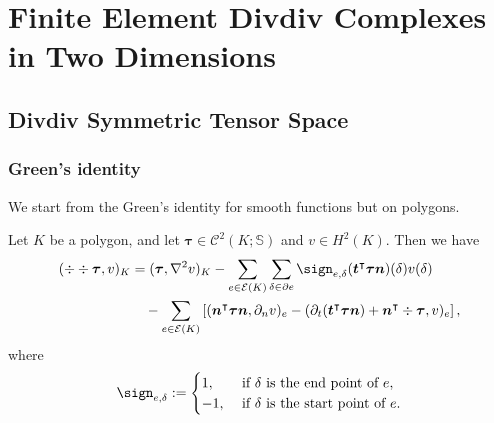\chapter{Finite Element Divdiv Complexes in Two Dimensions}



\section{Divdiv Symmetric Tensor Space}
\subsection{Green's identity}
We start from the Green's identity for smooth functions but on polygons.
\begin{lemma} \label{lm:Green}
Let $K$ be a polygon, and let $\boldsymbol  \tau\in \mathcal C^2(K; \mathbb S)$ and $v\in H^2(K)$. Then we have
\begin{align}
(\div\div\boldsymbol \tau, v)_K&=(\boldsymbol \tau, \nabla^2v)_K -\sum_{e\in\mathcal E(K)}\sum_{\delta\in\partial e}\sign_{e,\delta}(\boldsymbol  t^{\intercal}\boldsymbol \tau\boldsymbol  n)(\delta)v(\delta) \notag\\
&\quad - \sum_{e\in\mathcal E(K)}\left[(\boldsymbol  n^{\intercal}\boldsymbol \tau\boldsymbol n, \partial_n v)_{e}-(\partial_{t}(\boldsymbol  t^{\intercal}\boldsymbol \tau\boldsymbol n)+\boldsymbol n^{\intercal}\div\boldsymbol \tau,  v)_{e}\right], \label{eq:greenidentitydivdiv}
\end{align}
where
\[
\sign_{e,\delta}:=\begin{cases}
1, & \textrm{ if } \delta \textrm{ is the end point of } e, \\
-1, & \textrm{ if } \delta \textrm{ is the start point of } e.
\end{cases}
\]
\end{lemma}
